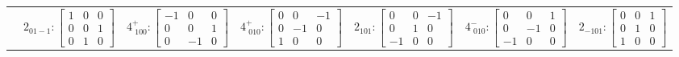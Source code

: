 \documentclass[fleqn,8pt,landscape]{jsarticle}
\begin{document}
\begin{longtable}{ccccccc}
& $ 2{}_{01-1}:\begin{bmatrix} 1 & 0 & 0 \\ 0 & 0 & 1 \\ 0 & 1 & 0 \end{bmatrix} $ & $ 4^{+}_{\,\,100}:\begin{bmatrix} -1 & 0 & 0 \\ 0 & 0 & 1 \\ 0 & -1 & 0 \end{bmatrix} $ & $ 4^{+}_{\,\,010}:\begin{bmatrix} 0 & 0 & -1 \\ 0 & -1 & 0 \\ 1 & 0 & 0 \end{bmatrix} $ & $ 2{}_{101}:\begin{bmatrix} 0 & 0 & -1 \\ 0 & 1 & 0 \\ -1 & 0 & 0 \end{bmatrix} $ & $ 4^{-}_{\,\,010}:\begin{bmatrix} 0 & 0 & 1 \\ 0 & -1 & 0 \\ -1 & 0 & 0 \end{bmatrix} $ & $ 2{}_{-101}:\begin{bmatrix} 0 & 0 & 1 \\ 0 & 1 & 0 \\ 1 & 0 & 0 \end{bmatrix} $ \\
\end{longtable}
\end{document}

